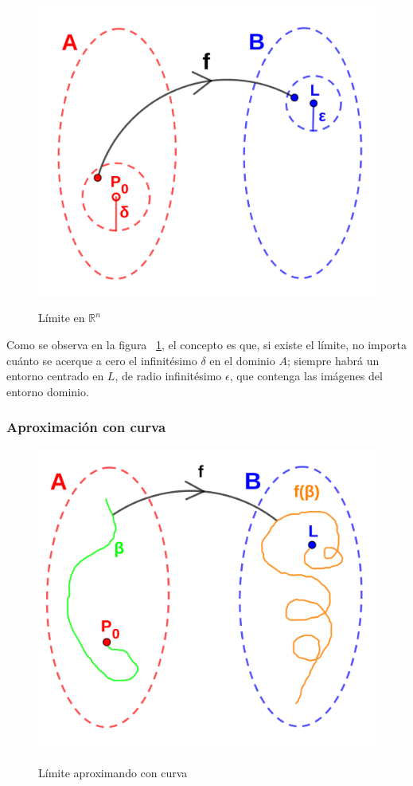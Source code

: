 \documentclass{article}
\renewcommand{\Bbb}{\mathbb}
\begin{document}
\begin{figure}[ht]
\caption{Límite en $\Bbb R^n$}
\includegraphics[scale=0.75]{img/teo_fig007_limite.png} 
\centering
\label{fig:limite}
\end{figure}

Como se observa en la figura ~\ref{fig:limite}, el concepto es que, si existe el límite, no importa cuánto se acerque a cero el infinitésimo $\delta$ en el dominio $A$; siempre habrá un entorno centrado en $L$, de radio infinitésimo $\epsilon$, que contenga las imágenes del entorno dominio.

\subsubsection{Aproximación con curva}

\begin{figure}[ht]
\caption{Límite aproximando con curva}
\includegraphics[scale=0.75]{img/teo_fig008_limite_curva.png}
\centering
\label{fig:limite_curva}
\end{figure}
\end{document}
